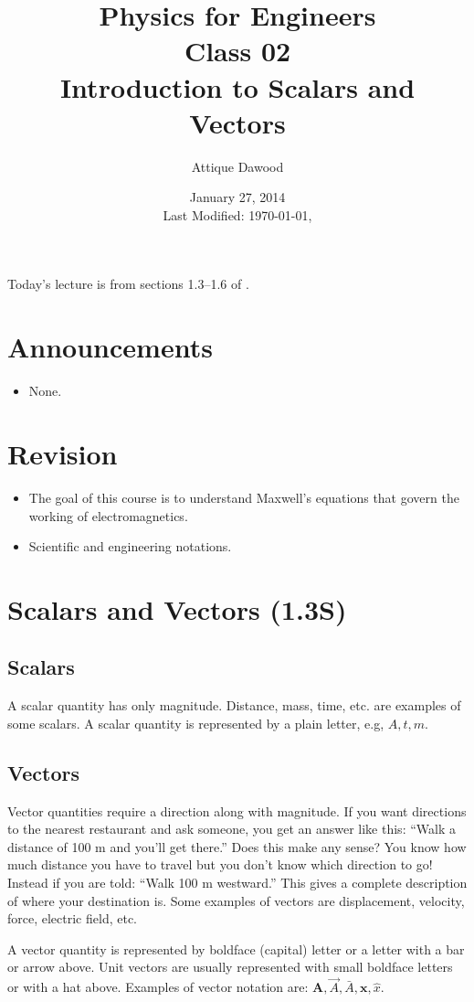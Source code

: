 \documentclass[12pt,a4paper]{article}
\title{\vspace{-2cm}Physics for Engineers\\Class 02\\Introduction to Scalars and Vectors}
\author{Attique Dawood}
\date{January 27, 2014\\[0.2cm] Last Modified: \today, \currenttime}
\begin{document}
\maketitle
Today's lecture is from sections 1.3--1.6 of \cite{Sadiku}.
\section{Announcements}
\begin{itemize}
\item None.
\end{itemize}
\section{Revision}
\begin{itemize}
\item The goal of this course is to understand Maxwell's equations that govern the working of electromagnetics.
\item Scientific and engineering notations.
\end{itemize}
\section{Scalars and Vectors (1.3S)}
\subsection{Scalars}
A scalar quantity has only magnitude. Distance, mass, time, etc. are examples of some scalars. A scalar quantity is represented by a plain letter, e.g, $A, t, m$.
\subsection{Vectors}
Vector quantities require a direction along with magnitude. If you want directions to the nearest restaurant and ask someone, you get an answer like this: ``Walk a distance of 100 m and you'll get there.'' Does this make any sense? You know how much distance you have to travel but you don't know which direction to go! Instead if you are told: ``Walk 100 m westward.'' This gives a complete description of where your destination is. Some examples of vectors are displacement, velocity, force, electric field, etc.

A vector quantity is represented by boldface (capital) letter or a letter with a bar or arrow above. Unit  vectors are usually represented with small boldface letters or with a hat above. Examples of vector notation are: $\textbf{{A}}, \vec{A}, \bar{A}, \textbf{x}, \hat{x}$.
\end{document}
